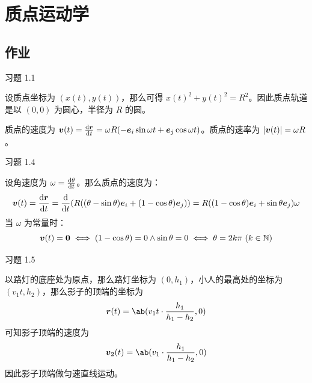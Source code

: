 \section{质点运动学}

\subsection{作业}

\begin{problem}
    习题 1.1
    \begin{solution}
        \item 设质点坐标为 $(x(t), y(t))$，那么可得 $x(t)^2 + y(t)^2 = R^2$。因此质点轨道是以 $(0, 0)$ 为圆心，半径为 $R$ 的圆。
        \item 质点的速度为 $\boldsymbol{v}(t) = \dv{\boldsymbol{r}}{t} = \omega R(-\boldsymbol{e}_i \sin \omega t + \boldsymbol{e}_j \cos \omega t)$。质点的速率为 $\abs{\boldsymbol{v}(t)} = \omega R$。
    \end{solution}
\end{problem}

\begin{problem}
    习题 1.4
    \begin{solution}
        设角速度为 $\omega =\dv{\theta}{t}$。那么质点的速度为：
        $$
        \boldsymbol{v}(t) = \dv{\boldsymbol{r}}{t} = \dv{t}(R((\theta - \sin \theta) \boldsymbol{e}_i + (1 - \cos \theta) \boldsymbol{e}_j)) = R((1 - \cos \theta) \boldsymbol{e}_i + \sin \theta \boldsymbol{e}_j) \omega
        $$
        当 $\omega$ 为常量时：
        $$
        \boldsymbol{v}(t) = \boldsymbol{0} \iff (1 - \cos \theta) = 0 \land \sin \theta = 0 \iff \theta = 2k \pi\ (k \in \mathbb{N})
        $$
    \end{solution}
\end{problem}

\begin{problem}
    习题 1.5
    \begin{solution}
        以路灯的底座处为原点，那么路灯坐标为 $(0, h_1)$，小人的最高处的坐标为 $(v_1 t, h_2)$，那么影子的顶端的坐标为
        $$
        \vect{r}(t) = \ab(v_1 t \cdot \frac{h_1}{h_1 - h_2}, 0)
        $$
        可知影子顶端的速度为
        $$
        \vect{v}_2(t) = \ab(v_1 \cdot \frac{h_1}{h_1 - h_2}, 0)
        $$
        因此影子顶端做匀速直线运动。
    \end{solution}
\end{problem}
